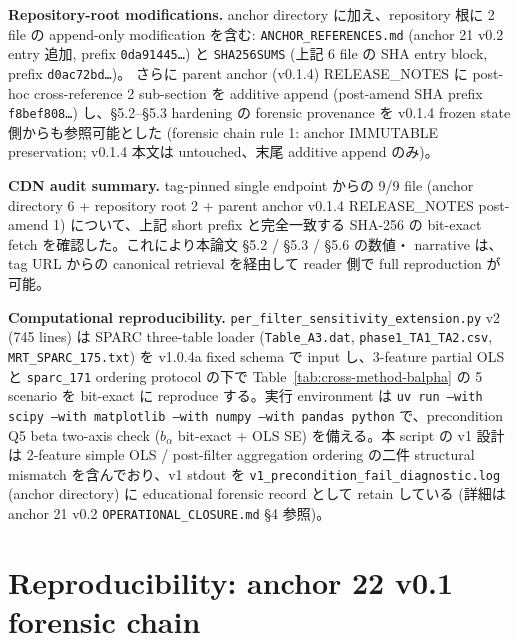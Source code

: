 \documentclass[11pt,a4paper]{ltjsarticle}
\begin{document}
\noindent\textbf{Repository-root modifications.}\quad
anchor directory に加え、repository 根に 2 file の append-only modification を含む:
\texttt{ANCHOR\_REFERENCES.md} (anchor 21 v0.2 entry 追加, prefix \texttt{0da91445\dots}) と
\texttt{SHA256SUMS} (上記 6 file の SHA entry block, prefix \texttt{d0ac72bd\dots})。
さらに parent anchor (v0.1.4) RELEASE\_NOTES に post-hoc cross-reference 2 sub-section を
additive append (post-amend SHA prefix \texttt{f8bef808\dots}) し、\S 5.2--\S 5.3
hardening の forensic provenance を v0.1.4 frozen state 側からも参照可能とした
(forensic chain rule 1: anchor IMMUTABLE preservation; v0.1.4 本文は untouched、末尾
additive append のみ)。

\noindent\textbf{CDN audit summary.}\quad
tag-pinned single endpoint からの 9/9 file (anchor directory 6 + repository root 2 +
parent anchor v0.1.4 RELEASE\_NOTES post-amend 1) について、上記 short prefix と完全一致する
SHA-256 の bit-exact fetch を確認した。これにより本論文 \S 5.2 / \S 5.3 / \S 5.6 の数値・
narrative は、tag URL からの canonical retrieval を経由して reader 側で full reproduction が
可能。

\noindent\textbf{Computational reproducibility.}\quad
\texttt{per\_filter\_sensitivity\_extension.py} v2 (745 lines) は SPARC three-table loader
(\texttt{Table\_A3.dat}, \texttt{phase1\_TA1\_TA2.csv}, \texttt{MRT\_SPARC\_175.txt}) を
v1.0.4a fixed schema で input し、3-feature partial OLS と \texttt{sparc\_171} ordering
protocol の下で Table~\ref{tab:cross-method-balpha} の 5 scenario を bit-exact に reproduce
する。実行 environment は \texttt{uv run --with scipy --with matplotlib --with numpy
--with pandas python} で、precondition Q5 beta two-axis check ($b_\alpha$ bit-exact +
OLS SE) を備える。本 script の v1 設計は 2-feature simple OLS / post-filter aggregation
ordering の二件 structural mismatch を含んでおり、v1 stdout を
\texttt{v1\_precondition\_fail\_diagnostic.log} (anchor directory) に educational
forensic record として retain している (詳細は anchor 21 v0.2
\texttt{OPERATIONAL\_CLOSURE.md} \S 4 参照)。


\section*{Reproducibility: anchor 22 v0.1 forensic chain}
\label{sec:reproducibility-axis4-v01}
\end{document}
